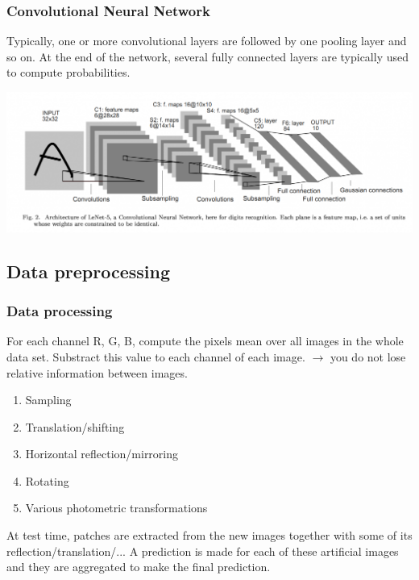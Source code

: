 \begin{frame}
	\frametitle{Convolutional Neural Network}
	
Typically, one or more convolutional layers are followed by one pooling layer and so on. At the end of the network, several fully connected layers are typically used to compute probabilities. 

\begin{center}
	\includegraphics[scale=0.3]{figs/LeNet}
\end{center}
\end{frame}


\subsection{Data preprocessing}

\begin{frame}
	\frametitle{Data processing}
	
	
	For each channel R, G, B, compute the pixels mean over all images in the whole data set. Substract this value to each channel of each image. 
	$\rightarrow$ you do not lose relative information between images. 
	
	\bigskip
	
	\begin{enumerate}
		\item Sampling 
		\item Translation/shifting 
		\item Horizontal reflection/mirroring 
		\item Rotating 
		\item Various photometric transformations
	\end{enumerate}
	
	
	At test time, patches are extracted from the new images together with some of its reflection/translation/... A prediction is made for each of these artificial images and they are aggregated to make the final prediction. 
	
\end{frame}



